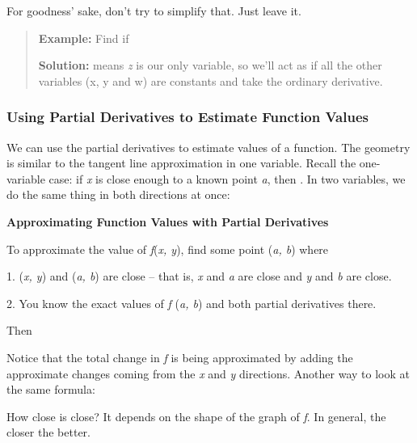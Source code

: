 For goodness' sake, don't try to simplify that. Just leave it.

\begin{quote}
\textbf{Example:} Find if

\textbf{Solution:} means \emph{z} is our only variable, so we'll act as
if all the other variables (x, y and w) are constants and take the
ordinary derivative.
\end{quote}

\subsubsection{Using Partial Derivatives to Estimate Function
Values}\label{using-partial-derivatives-to-estimate-function-values}

We can use the partial derivatives to estimate values of a function. The
geometry is similar to the tangent line approximation in one variable.
Recall the one-variable case: if \emph{x} is close enough to a known
point \emph{a}, then . In two variables, we do the same thing in both
directions at once:

\textbf{Approximating Function Values with Partial Derivatives}

To approximate the value of \emph{f}(\emph{x, y}), find some point
(\emph{a, b}) where

1. (\emph{x, y}) and (\emph{a, b}) are close -- that is, \emph{x} and
\emph{a} are close and \emph{y} and \emph{b} are close.

2. You know the exact values of \emph{f} (\emph{a, b}) and both partial
derivatives there.

Then

Notice that the total change in \emph{f} is being approximated by adding
the approximate changes coming from the \emph{x} and \emph{y}
directions. Another way to look at the same formula:

How close is close? It depends on the shape of the graph of \emph{f}. In
general, the closer the better.

